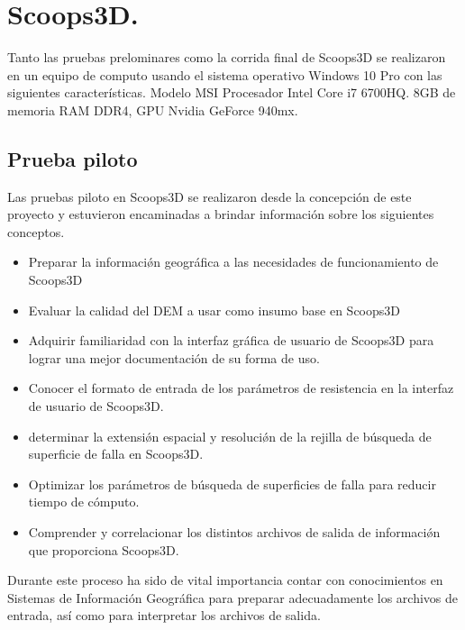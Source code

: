 \chapter{Scoops3D.}
Tanto las pruebas prelominares como la corrida final de Scoops3D se realizaron en un equipo de
computo usando el sistema operativo Windows 10 Pro con las siguientes caracter\'{i}sticas.
Modelo MSI Procesador Intel Core i7 6700HQ. 8GB de memoria RAM DDR4, GPU Nvidia
GeForce 940mx.

\section{Prueba piloto} 

Las pruebas piloto en Scoops3D se realizaron desde la concepci\'on de este proyecto y
estuvieron encaminadas a brindar informaci\'on sobre los siguientes conceptos.



\begin{itemize}
\item Preparar la informaci\'{\o}n geogr\'{a}fica a las necesidades de funcionamiento de
Scoops3D
 \item Evaluar la calidad del DEM a usar como insumo base en Scoops3D

 \item Adquirir familiaridad con la interfaz gr\'{a}fica de usuario de Scoops3D para lograr una mejor documentaci\'on de su forma de uso.
 \item Conocer el formato de entrada de los par\'{a}metros de resistencia en la interfaz de
usuario de Scoops3D.
 \item determinar la extensi\'{\o}n espacial y resoluci\'{\o}n de la rejilla de b\'{u}squeda de superficie de falla en Scoops3D.
 \item Optimizar los par\'{a}metros de b\'{u}squeda de superficies de falla para reducir tiempo de
c\'omputo.
 \item Comprender y correlacionar los distintos archivos de salida de informaci\'{\o}n que
proporciona Scoops3D.

\end{itemize}

Durante este proceso ha sido de vital importancia contar con conocimientos en Sistemas de Informaci\'on Geogr\'afica para preparar adecuadamente los archivos de entrada, as\'i como para interpretar los archivos de salida.